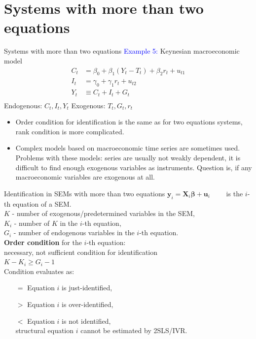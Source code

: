 \documentclass[usenames,dvipsnames]{beamer}
\begin{document}
\section{Systems with more than two equations}
\begin{frame}{Systems with more than two equations}
\textcolor{Blue}{Example 5:} Keynesian macroeconomic model
\vspace{0.2cm}
\begin{align*}
C_t & = \beta_0 + \beta_1(Y_t - T_t) + \beta_2 r_t + u_{t1} \\
I_t & = \gamma_0 + \gamma_1 r_t + u_{t2} \\
Y_t & \equiv C_t + I_t + G_t \\
\end{align*}
\vspace{-0.2cm}
\noindent Endogenous: $C_t, I_t, Y_t$ \hfill Exogenous: $T_t, G_t, r_t $ \\ 
\medskip
\begin{itemize}
\item Order condition for identification is the same as for two equations systems, rank condition is more complicated. 
\item Complex models based on macroeconomic time series are sometimes used. Problems with these models: series are usually not weakly dependent, it is difficult to find enough exogenous variables as instruments. Question is, if any macroeconomic variables are exogenous at all.
\end{itemize}
\end{frame}
\begin{frame}{Identification in SEMs with more than two equations}
$\bm{y}_i = \bm{X}_i \bm{\beta}  + \bm{u}_i \qquad$ is the $i$-th equation of a SEM.\\
\medskip
$K$ - number of exogenous/predetermined variables in the SEM,\\ 
$K_i$ - number of $K$ in the $i$-th equation,\\
$G_i$ - number of endogenous variables in the $i$-th equation.\\
\bigskip
\textbf{Order condition} for the $i$-th equation:\\
necessary, not sufficient condition for identification\\
\bigskip
$K-K_i \geq G_i -1$\\
\bigskip
Condition evaluates as:
\begin{itemize}
\item[$=$] Equation $i$ is just-identified,
\item[$>$] Equation $i$ is over-identified,
\item[$<$] Equation $i$ is  not identified,\\
structural equation $i$ cannot be estimated by 2SLS/IVR.
\end{itemize}
\end{frame}
\end{document}
